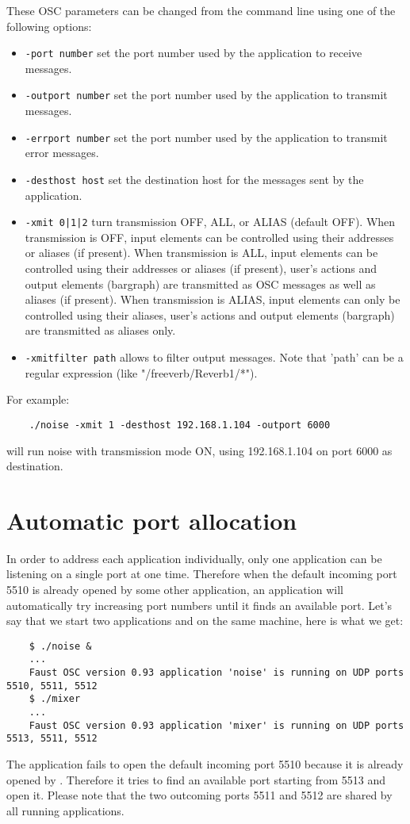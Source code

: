 These OSC parameters can be changed from the command line using one of the following options:
\begin{itemize}
\item \lstinline'-port number' set the port number used by the application to receive messages.
\item \lstinline'-outport number' set the port number used by the application to transmit messages.
\item \lstinline'-errport number' set the port number used by the application to transmit error messages.
\item \lstinline'-desthost host' set the destination host for the messages sent by the application.
\item \lstinline'-xmit 0|1|2' turn transmission OFF, ALL, or ALIAS (default OFF). When transmission is OFF, input elements can be controlled using their addresses or aliases (if present). When transmission is ALL, input elements can be controlled using their addresses or aliases (if present), user's actions and output elements (bargraph) are transmitted as OSC messages as well as aliases (if present). When transmission is ALIAS,  input elements can only be controlled using their aliases, user's actions and output elements (bargraph) are transmitted as aliases only.
\item \lstinline'-xmitfilter path' allows to filter output messages. Note that 'path' can be a regular expression (like "/freeverb/Reverb1/*").
\end{itemize}

For example:
\begin{lstlisting}
	./noise -xmit 1 -desthost 192.168.1.104 -outport 6000
\end{lstlisting}
will run noise with transmission mode ON, using 192.168.1.104 on port 6000 as destination.

\section{Automatic port allocation}
In order to address each application individually, only one application can be listening on a single port at one time. Therefore when the default incoming port 5510 is already opened by some other application, an application will automatically try increasing port numbers until it finds an available port. Let's say that we start two applications  and  on the same machine, here is what we get:
\begin{lstlisting}
	$ ./noise &
	...
	Faust OSC version 0.93 application 'noise' is running on UDP ports 5510, 5511, 5512
	$ ./mixer
	...
	Faust OSC version 0.93 application 'mixer' is running on UDP ports 5513, 5511, 5512
\end{lstlisting}
The  application fails to open the default incoming port 5510 because it is already opened by . Therefore it tries to find an available port starting from 5513 and open it. Please note that the two outcoming ports 5511 and 5512 are shared by all running applications.

